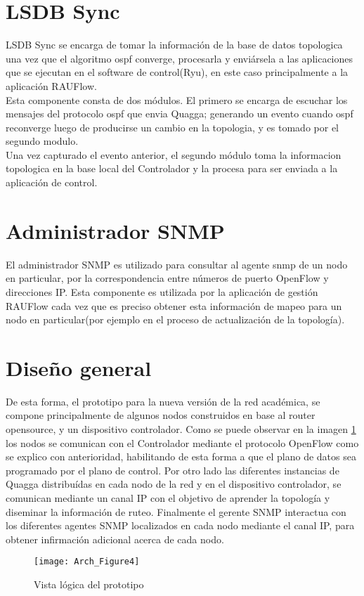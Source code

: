 \section{LSDB Sync}
LSDB Sync se encarga de tomar la información de la base de datos topologica una vez que el algoritmo ospf converge, procesarla y enviársela a las aplicaciones que se ejecutan en el software de control(Ryu), en este caso principalmente a la aplicación RAUFlow.\\

Esta componente consta de dos módulos. El primero se encarga de escuchar los mensajes del protocolo ospf que envia Quagga; generando un evento cuando ospf reconverge luego de producirse un cambio en la topologia, y es tomado por el segundo modulo.\\

Una vez capturado el evento anterior, el segundo m\'odulo toma la informacion topologica en la base local del Controlador y la procesa para ser enviada a la aplicación de control.

\section{Administrador SNMP}

El administrador SNMP es utilizado para consultar al agente snmp de un nodo en particular, por la correspondencia entre números de puerto OpenFlow y direcciones IP. Esta componente es utilizada por la aplicación de gestión RAUFlow cada vez que es preciso obtener esta información de mapeo para un nodo en particular(por ejemplo en el proceso de actualización de la topolog\'ia).

\section{Dise\~no general}

De esta forma, el prototipo para la nueva versi\'on de la red acad\'emica, se compone principalmente de algunos nodos construidos en base al router opensource, y un dispositivo controlador. Como se puede observar en la imagen \ref{fig:OpenSourceRArch4} los nodos se comunican con el Controlador mediante el protocolo OpenFlow como se explico con anterioridad, habilitando de esta forma a que el plano de datos sea programado por el plano de control. Por otro lado las diferentes instancias de Quagga distribu\'idas en cada nodo de la red y en el dispositivo controlador, se comunican mediante un canal IP con el objetivo de aprender la topolog\'ia y diseminar la informaci\'on de ruteo. Finalmente el gerente SNMP interactua con los diferentes agentes SNMP localizados en cada nodo mediante el canal IP, para obtener infirmaci\'on adicional acerca de cada nodo. 

\begin{figure}[htbp!] 
\centering    
\texttt{[image: Arch\_Figure4]}
\caption[OpenSourceRArch4]{Vista l\'ogica del prototipo}
\label{fig:OpenSourceRArch4}
\end{figure}